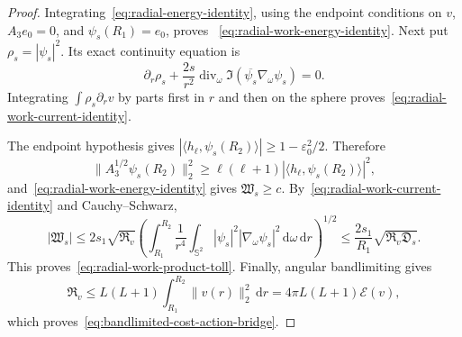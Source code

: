 \documentclass[11pt]{article}
\newcommand{\dd}{\,\mathrm d}
\theoremstyle{definition}
\theoremstyle{remark}
\begin{document}
\begin{proof}
Integrating~\eqref{eq:radial-energy-identity}, using the endpoint conditions
on $v$, $A_3e_0=0$, and $\psi_s(R_1)=e_0$, proves
~\eqref{eq:radial-work-energy-identity}.  Next put
$\rho_s=|\psi_s|^2$.  Its exact continuity equation is
\begin{equation}
 \partial_r\rho_s
 +\frac{2s}{r^2}\operatorname{div}_\omega
 \Im(\overline{\psi_s}\nabla_\omega\psi_s)=0.
\end{equation}
Integrating $\int\rho_s\partial_rv$ by parts first in $r$ and then on the
sphere proves~\eqref{eq:radial-work-current-identity}.

The endpoint hypothesis gives
$|\langle h_\ell,\psi_s(R_2)\rangle|\geq
1-\varepsilon_0^2/2$.  Therefore
\begin{equation}
 \|A_3^{1/2}\psi_s(R_2)\|_2^2
 \geq\ell(\ell+1)
 |\langle h_\ell,\psi_s(R_2)\rangle|^2,
\end{equation}
and~\eqref{eq:radial-work-energy-identity} gives
$\mathfrak W_s\geq c$.  By~\eqref{eq:radial-work-current-identity} and
Cauchy--Schwarz,
\begin{equation}
 |\mathfrak W_s|
 \leq2s_1\sqrt{\mathfrak R_v}
 \left(
 \int_{R_1}^{R_2}\frac1{r^4}
 \int_{\mathbb S^2}|\psi_s|^2|\nabla_\omega\psi_s|^2
 \dd\omega\dd r
 \right)^{1/2}
 \leq\frac{2s_1}{R_1}
 \sqrt{\mathfrak R_v\mathfrak D_s}.
\end{equation}
This proves~\eqref{eq:radial-work-product-toll}.  Finally, angular
bandlimiting gives
\begin{equation}
 \mathfrak R_v
 \leq L(L+1)\int_{R_1}^{R_2}\|v(r)\|_2^2\dd r
 =4\pi L(L+1)\mathcal E(v),
\end{equation}
which proves~\eqref{eq:bandlimited-cost-action-bridge}.
\end{proof}
\end{document}
